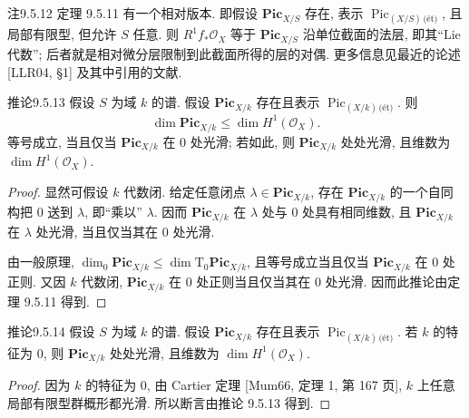 \begin{origstatement}{注}{9.5.12}\label{ch09s05:rem9.5.12}
定理 9.5.11 有一个相对版本. 即假设 $\mathbf{Pic}_{X/S}$ 存在, 表示 $\operatorname{Pic}_{(X/S)\,\text{(\'{e}t)}}$, 且局部有限型, 但允许 $S$ 任意. 则 $R^1f_*\mathcal O_X$ 等于 $\mathbf{Pic}_{X/S}$ 沿单位截面的法层, 即其“Lie 代数”; 后者就是相对微分层限制到此截面所得的层的对偶. 更多信息见最近的论述 [LLR04, \S1] 及其中引用的文献.


\end{origstatement}

\begin{origstatement}{推论}{9.5.13}\label{ch09s05:cor9.5.13}
假设 $S$ 为域 $k$ 的谱. 假设 $\mathbf{Pic}_{X/k}$ 存在且表示 $\operatorname{Pic}_{(X/k)\,\text{(\'{e}t)}}$. 则
\[
 \dim\mathbf{Pic}_{X/k}\leq\dim H^1(\mathcal O_X).
\]
等号成立, 当且仅当 $\mathbf{Pic}_{X/k}$ 在 $0$ 处光滑; 若如此, 则 $\mathbf{Pic}_{X/k}$ 处处光滑, 且维数为 $\dim H^1(\mathcal O_X)$.
\end{origstatement}
\begin{proof}
显然可假设 $k$ 代数闭. 给定任意闭点 $\lambda\in\mathbf{Pic}_{X/k}$, 存在 $\mathbf{Pic}_{X/k}$ 的一个自同构把 $0$ 送到 $\lambda$, 即“乘以” $\lambda$. 因而 $\mathbf{Pic}_{X/k}$ 在 $\lambda$ 处与 $0$ 处具有相同维数, 且 $\mathbf{Pic}_{X/k}$ 在 $\lambda$ 处光滑, 当且仅当其在 $0$ 处光滑.

由一般原理, $\dim_0\mathbf{Pic}_{X/k}\leq\dim\mathrm T_0\mathbf{Pic}_{X/k}$, 且等号成立当且仅当 $\mathbf{Pic}_{X/k}$ 在 $0$ 处正则. 又因 $k$ 代数闭, $\mathbf{Pic}_{X/k}$ 在 $0$ 处正则当且仅当其在 $0$ 处光滑. 因而此推论由定理 9.5.11 得到.
\end{proof}

\begin{origstatement}{推论}{9.5.14}\label{ch09s05:cor9.5.14}
假设 $S$ 为域 $k$ 的谱. 假设 $\mathbf{Pic}_{X/k}$ 存在且表示 $\operatorname{Pic}_{(X/k)\,\text{(\'{e}t)}}$. 若 $k$ 的特征为 $0$, 则 $\mathbf{Pic}_{X/k}$ 处处光滑, 且维数为 $\dim H^1(\mathcal O_X)$.
\end{origstatement}
\begin{proof}
因为 $k$ 的特征为 $0$, 由 Cartier 定理 [Mum66, 定理 1, 第 167 页], $k$ 上任意局部有限型群概形都光滑. 所以断言由推论 9.5.13 得到.
\end{proof}

